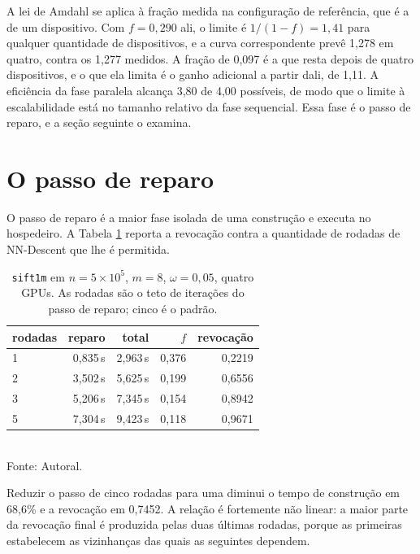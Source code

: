 A lei de Amdahl \cite{amdahl} se aplica à fração medida na configuração de referência, que é a de um dispositivo. Com $f = 0{,}290$ ali, o limite é $1/(1-f) = 1{,}41$ para qualquer quantidade de dispositivos, e a curva correspondente prevê 1,278 em quatro, contra os 1,277 medidos. A fração de 0,097 é a que resta depois de quatro dispositivos, e o que ela limita é o ganho adicional a partir dali, de 1,11. A eficiência da fase paralela alcança 3,80 de 4,00 possíveis, de modo que o limite à escalabilidade está no tamanho relativo da fase sequencial. Essa fase é o passo de reparo, e a seção seguinte o examina.\\

\section{O passo de reparo\label{sec:res-repair}}

O passo de reparo é a maior fase isolada de uma construção e executa no hospedeiro. A Tabela \ref{tab:refine} reporta a revocação contra a quantidade de rodadas de NN-Descent que lhe é permitida.\\

\begin{table}[htb!]
\caption{\label{tab:refine} \texttt{sift1m} em $n = 5 \times 10^5$, $m = 8$, $\omega = 0{,}05$, quatro \ac{GPU}s. As rodadas são o teto de iterações do passo de reparo; cinco é o padrão.}
\centering
\footnotesize
\begin{tabular}{@{}lrrrr@{}}
\toprule
rodadas & reparo & total & $f$ & revocação \\
\midrule
1 & 0,835\,s & 2,963\,s & 0,376 & 0,2219 \\
2 & 3,502\,s & 5,625\,s & 0,199 & 0,6556 \\
3 & 5,206\,s & 7,345\,s & 0,154 & 0,8942 \\
5 & 7,304\,s & 9,423\,s & 0,118 & 0,9671 \\
\bottomrule
\end{tabular}\\
Fonte: Autoral.
\end{table}

Reduzir o passo de cinco rodadas para uma diminui o tempo de construção em 68,6\% e a revocação em 0,7452. A relação é fortemente não linear: a maior parte da revocação final é produzida pelas duas últimas rodadas, porque as primeiras estabelecem as vizinhanças das quais as seguintes dependem.\\

